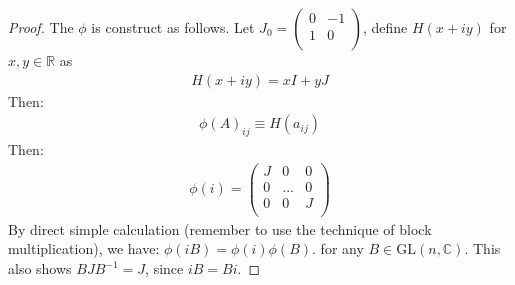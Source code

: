 \documentclass{article}
\numberwithin{equation}{subsection} %
\theoremstyle{definition}
\begin{document}
        \begin{proof}
            The $\phi$ is construct as follows. Let 
            $J_0=\left( \begin{array}{cc}
                 0 & -1 \\
            1 & 0 \\ \end{array} \right)$, define $H(x+iy)$ for
            $x,y\in \mathbb{R}$ as
            \begin{align}
                H(x+iy) = x I + y J
            \end{align}
            Then:
            \begin{align}
                \phi(A)_{ij} \equiv H(a_{ij})
            \end{align}
            Then:
            \begin{align}
                \phi(i) = \left( \begin{array}{ccc}
                     J & 0 & 0 \\
                     0 & \text{...} & 0 \\
                     0 & 0 & J \\
                    \end{array} \right)
            \end{align}
            By direct simple calculation (remember to use the technique
            of block multiplication), we have:
            $\phi(i B)= \phi(i)\phi(B)$.
            for any $B\in \mathrm{GL}(n,\mathbb{C})$. This also shows 
            $BJB^{-1}=J$, since $iB=Bi$.
            

\end{proof}
\end{document}
